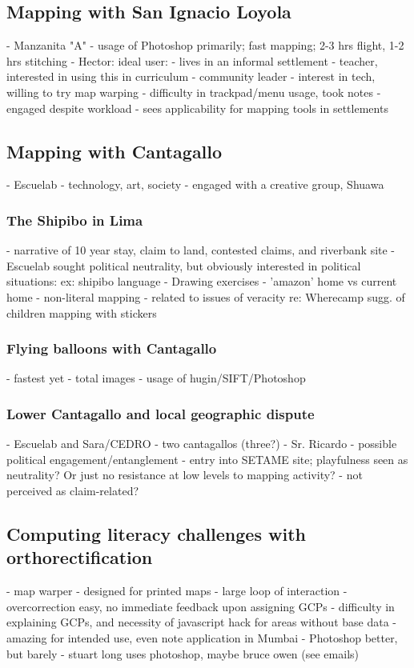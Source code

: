 \documentclass[11pt]{report}
\begin{document}
\subsection{Mapping with San Ignacio Loyola}
            - Manzanita "A"
            - usage of Photoshop primarily; fast mapping; 2-3 hrs flight, 1-2 hrs stitching
            - Hector: ideal user: 
                - lives in an informal settlement
                - teacher, interested in using this in curriculum
                - community leader
                - interest in tech, willing to try map warping
                    - difficulty in trackpad/menu usage, took notes
                - engaged despite workload
                - sees applicability for mapping tools in settlements

\subsection{Mapping with Cantagallo}
            - Escuelab - technology, art, society
            - engaged with a creative group, Shuawa
\subsubsection{The Shipibo in Lima}
            - narrative of 10 year stay, claim to land, contested claims, and riverbank site
            - Escuelab sought political neutrality, but obviously interested in political situations: ex: shipibo language            - Drawing exercises
                - 'amazon' home vs current home
                - non-literal mapping - related to issues of veracity re: Wherecamp sugg. of children mapping with stickers
\subsubsection{Flying balloons with Cantagallo}
- fastest yet
                - total images
                - usage of hugin/SIFT/Photoshop
\subsubsection{Lower Cantagallo and local geographic dispute}
            - Escuelab and Sara/CEDRO
	- two cantagallos (three?)
            - Sr. Ricardo - possible political engagement/entanglement
            - entry into SETAME site; playfulness seen as neutrality? Or just no resistance at low levels to mapping activity?
                - not perceived as claim-related?
\subsection{Computing literacy challenges with orthorectification}
	- map warper
        - designed for printed maps
        - large loop of interaction - overcorrection easy, no immediate feedback upon assigning GCPs
        - difficulty in explaining GCPs, and necessity of javascript hack for areas without base data
        - amazing for intended use, even note application in Mumbai
    - Photoshop better, but barely
	- stuart long uses photoshop, maybe bruce owen (see emails)
\end{document}

